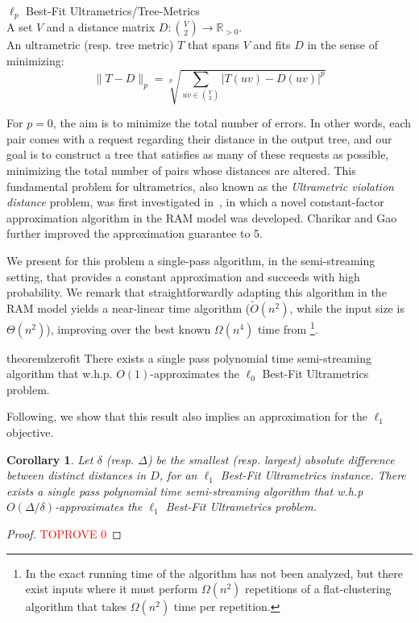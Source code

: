 \documentclass{article}
\newtheorem{corollary}[theorem]{Corollary}
\begin{document}
 $\ell_p$ Best-Fit Ultrametrics/Tree-Metrics \smallskip\\
 A set $V$ 
and a distance matrix \( D: \binom{V}{2} \rightarrow \mathbb{R}_{>0} \).
\smallskip\\
 An ultrametric (resp. tree metric) $T$ that spans $V$ and 
fits $D$ in the sense of minimizing:
\begin{equation*}
\|T-D\|_p=\sqrt[p]{\sum_{uv\in \binom{V}{2}} |T(uv)-D(uv)|^p}
\end{equation*}

\vspace{-2mm}
For \(p=0\), the aim is to minimize the total number of errors. In other words, each pair comes with a request regarding their distance in the output tree, and our goal is to construct a tree that satisfies as many of these requests as possible, minimizing the total number of pairs whose distances are altered. This fundamental problem for ultrametrics, also known as the \emph{Ultrametric violation distance} problem, was first investigated in~\cite{cohen2022fitting}, in which a novel constant-factor approximation algorithm in the RAM model was developed.
Charikar and Gao~\cite{CharikarG24} further improved the approximation guarantee to 5. 

We present for this problem a single-pass algorithm, in the semi-streaming setting, that provides a constant approximation and succeeds with high probability.
We remark that straightforwardly adapting this algorithm in the RAM model yields a near-linear time algorithm ($\widetilde{O}(n^2)$, while the input size is $\Theta(n^2)$), improving over the best known $\Omega(n^4)$ time from \cite{cohen2022fitting}\footnote{In \cite{cohen2022fitting} the exact running time of the algorithm has not been analyzed, but there exist inputs where it must perform $\Omega(n^2)$ repetitions of a flat-clustering algorithm that takes $\Omega(n^2)$ time per repetition.}.

\begin{restatable}{theorem}{lzerofit}\label{theorem:lzerofit}
There exists a single pass polynomial time semi-streaming algorithm that
w.h.p. $O(1)$-approximates the $\ell_0$ Best-Fit Ultrametrics problem.
\end{restatable}

Following, we show that this result also implies an approximation for the $\ell_1$ objective.

\begin{corollary} \label{cor:l1ApxUltra}
Let $\delta$ (resp. $\Delta$) be the smallest (resp. largest) absolute difference between distinct distances in $D$, for an $\ell_1$ Best-Fit Ultrametrics instance. There exists a single pass polynomial time semi-streaming algorithm that w.h.p $O(\Delta/\delta)$-approximates the $\ell_1$ Best-Fit Ultrametrics problem.
\end{corollary}
\begin{proof}\textcolor{red}{TOPROVE 0}\end{proof}
\end{document}
